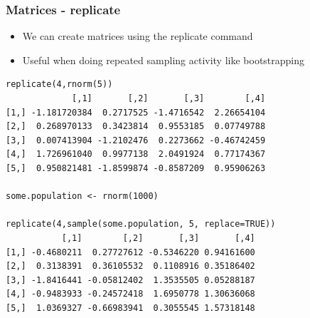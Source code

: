 \documentclass{beamer}
\begin{document}
%

\begin{frame}[fragile]
\frametitle{Matrices - replicate}
\begin{itemize}
\item We can create matrices using the replicate command
\item Useful when doing repeated sampling activity like bootstrapping
\end{itemize}
\footnotesize
\begin{verbatim}
replicate(4,rnorm(5))
             [,1]       [,2]       [,3]        [,4]
[1,] -1.181720384  0.2717525 -1.4716542  2.26654104
[2,]  0.268970133  0.3423814  0.9553185  0.07749788
[3,]  0.007413904 -1.2102476  0.2273662 -0.46742459
[4,]  1.726961040  0.9977138  2.0491924  0.77174367
[5,]  0.950821481 -1.8599874 -0.8587209  0.95906263

some.population <- rnorm(1000)

replicate(4,sample(some.population, 5, replace=TRUE))
           [,1]        [,2]       [,3]       [,4]
[1,] -0.4680211  0.27727612 -0.5346220 0.94161600
[2,]  0.3138391  0.36105532  0.1108916 0.35186402
[3,] -1.8416441 -0.05812402  1.3535505 0.05288187
[4,] -0.9483933 -0.24572418  1.6950778 1.30636068
[5,]  1.0369327 -0.66983941  0.3055545 1.57318148
\end{verbatim}
\end{frame}

%
\end{document}
